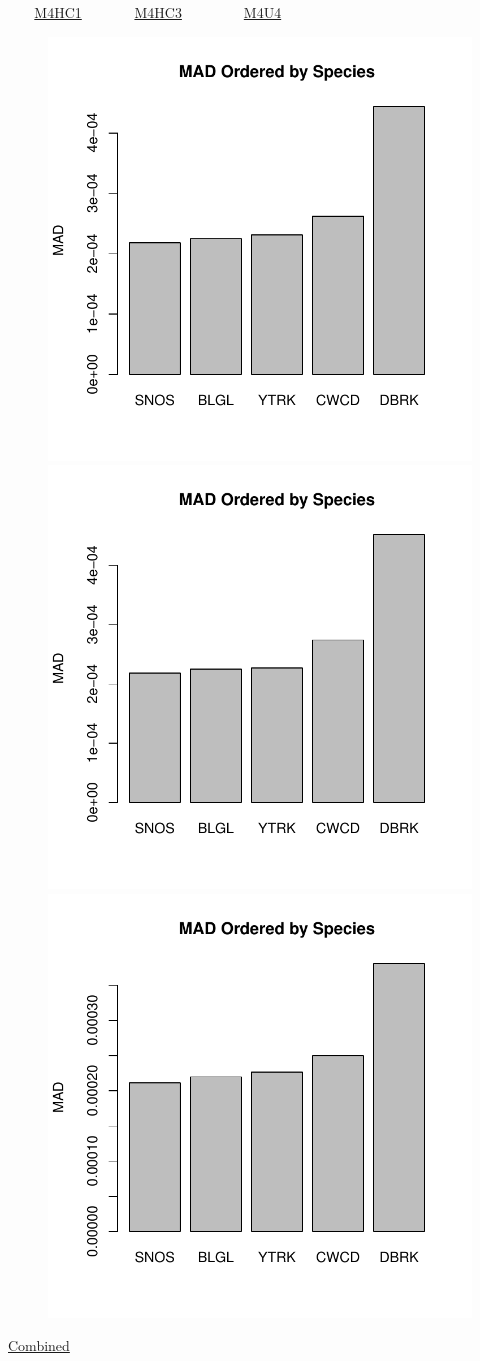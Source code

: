\documentclass[ xcolor = pdftex, dvipsnames, table ]{beamer}
\begin{document}
\begin{frame}{$~~~~~~~$ \href{https://github.com/gasduster99/sppComp/tree/master/sscRuns/25319781982M4HC1}{M4HC1} $~~~~~~~~~~~~~~$ \href{https://github.com/gasduster99/sppComp/tree/master/sscRuns/25319781982M4HC3}{M4HC3} $~~~~~~~~~~~~~~~~~$ \href{https://github.com/gasduster99/sppComp/tree/master/sscRuns/25319781982M4U4}{M4U4} }
        \begin{figure}[ht!]
        \centering
        \hspace*{-1cm}
        \includegraphics[width=.4\textwidth]{../sscRuns/25319781982M4HC1/sppTailMad68.pdf}
        \includegraphics[width=.4\textwidth]{../sscRuns/25319781982M4HC3/sppTailMad68.pdf}
        \includegraphics[width=.4\textwidth]{../sscRuns/25319781982M4U4/sppTailMad68.pdf}
        \end{figure}
	\vspace{-1cm}
	\begin{center}
	\Large
	\href{https://github.com/gasduster99/sppComp/tree/master/try1/postSSC/25319781982M4HC1HC3U4}{Combined}
	\end{center}
\end{frame}
\end{document}

